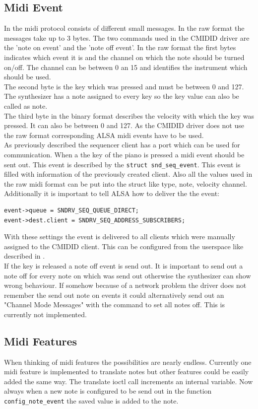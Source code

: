 \documentclass[paper=a4,fontsize=11pt,twocolumn,pagesize,bibtotoc]{scrartcl}
\begin{document}
\subsection{Midi Event}
In the midi protocol consists of different small messages. In the raw format the messages take up to 3 bytes. The two commands used in the CMIDID driver are the 'note on event' and the 'note off event'. In the raw format the first bytes indicates which event it is and the channel on which the note should be turned on/off. The channel can be between 0 an 15 and identifies the instrument which should be used.
\\
The second byte is the key which was pressed and must be between 0 and 127. The synthesizer has a note assigned to every key so the key value can also be called as note.\\
 The third byte in the binary format describes the velocity with which the key was pressed. It can also be between 0 and 127. As the CMIDID driver does not use the raw format corresponding ALSA midi events have to be used.\\
As previously described the sequencer client has a port which can be used for communication. When a the key of the piano is pressed a midi event should be sent out.
This event is described by the \texttt{struct snd\_seq\_event}. This event is filled with information of the previously created client.  Also all the values used in the raw midi format can be put into the struct like type, note, velocity channel. Additionally it is important to tell ALSA how to deliver the the event:
\begin{lstlisting}
event->queue = SNDRV_SEQ_QUEUE_DIRECT;
event->dest.client = SNDRV_SEQ_ADDRESS_SUBSCRIBERS;
\end{lstlisting}
With these settings the event is delivered to all clients which were manually assigned to the CMIDID client. This can be configured from the userspace like described in
 .\\
 If the key is released a note off event is send out. It is important to send out a note off for every note on which was send out otherwise the synthesizer can show wrong behaviour. If somehow because of a network problem the driver does not remember the send out note on events it could alternatively send out an "Channel Mode Messages" with the command to set all notes off. This is currently not implemented.
\cite{midimessages}
\subsection{Midi Features}
When thinking of midi features the possibilities are nearly endless. Currently one midi feature is implemented to translate notes but other features could be easily added the same way. The translate ioctl call increments an internal variable. Now always when a new note is configured to be send out in the function \texttt{config\_note\_event} the saved value is added to the note.
\end{document}
